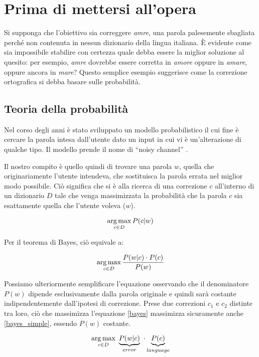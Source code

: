\chapter{Prima di mettersi all'opera}
\label{cap_teoria}
Si supponga che l'obiettivo sia correggere \emph{amre}, una parola palesemente sbagliata perché non contenuta in nessun dizionario della lingua italiana. È evidente come sia impossibile stabilire con certezza quale debba essere la miglior soluzione al quesito: per esempio, \emph{amre} dovrebbe essere corretta in \emph{amore} oppure in \emph{amare}, oppure ancora in \emph{mare}? Questo semplice esempio suggerisce come la correzione ortografica si debba basare sulle probabilità. 

\section{Teoria della probabilità}

Nel corso degli anni è stato sviluppato un modello probabilistico il cui fine è cercare la parola intesa dall'utente dato un input in cui vi è un'alterazione di qualche tipo. Il modello prende il nome di ``noisy channel'' \cite{noisychannel}.

Il nostro compito è quello quindi di trovare una parola $w$, quella che originariamente l'utente intendeva, che sostituisca la parola errata nel miglior modo possibile. Ciò significa che si è alla ricerca di una correzione $c$ all'interno di un dizionario $D$ tale che venga massimizzata la probabilità che la parola $c$ sia esattamente quella che l'utente voleva ($w$).

\begin{equation}
\operatorname*{arg\,max}_{c \in D} P(c|w)
\end{equation}

Per il teorema di Bayes, ciò equivale a:

\begin{equation}
\label{bayes}
\operatorname*{arg\,max}_{c \in D} \frac{P(w|c)\cdot P(c)}{P(w)}
\end{equation}

Possiamo ulteriormente semplificare l'equazione osservando che il denominatore $P(w)$ dipende esclusivamente dalla parola originale e quindi sarà costante indipendentemente dall'ipotesi di correzione. Prese due correzioni $c_1$ e $c_2$ distinte tra loro, ciò che massimizza l'equazione \eqref{bayes} massimizza sicuramente anche \eqref{bayes_simple}, essendo $P(w)$ costante.

\begin{equation}
\label{bayes_simple}
\operatorname*{arg\,max}_{c \in D} \, \, \underbrace{P(w|c)}_{error} \, \, \cdot \underbrace{P(c)}_{language}
\end{equation}


